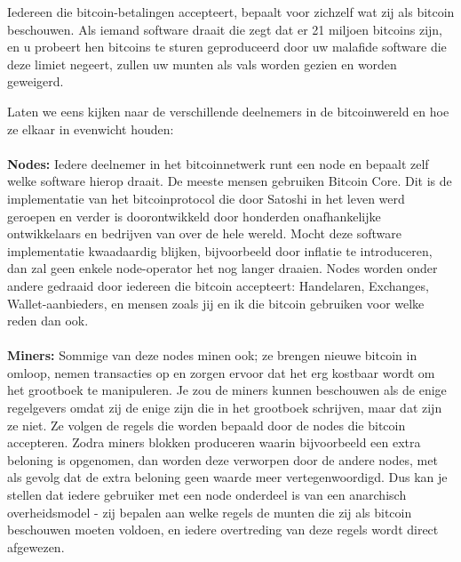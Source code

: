 Iedereen die bitcoin-betalingen accepteert, bepaalt voor zichzelf wat zij als bitcoin beschouwen. Als iemand software draait die zegt dat er 21 miljoen bitcoins zijn, en u probeert hen bitcoins te sturen geproduceerd door uw malafide software die deze limiet negeert, zullen uw munten als vals worden gezien en worden geweigerd.

Laten we eens kijken naar de verschillende deelnemers in de bitcoinwereld en hoe ze elkaar in evenwicht houden:

\paragraph{}
\noindent\textbf{Nodes:} 
Iedere deelnemer in het bitcoinnetwerk runt een node en bepaalt zelf welke software hierop draait. De meeste mensen gebruiken Bitcoin Core. Dit is de implementatie van het bitcoinprotocol die door Satoshi in het leven werd geroepen en verder is doorontwikkeld door honderden onafhankelijke ontwikkelaars en bedrijven van over de hele wereld. Mocht deze software implementatie kwaadaardig blijken, bijvoorbeeld door inflatie te introduceren, dan zal geen enkele node-operator het nog langer draaien. Nodes worden onder andere gedraaid door iedereen die bitcoin accepteert: Handelaren, Exchanges, Wallet-aanbieders, en mensen zoals jij en ik die bitcoin gebruiken voor welke reden dan ook. 

\paragraph{}
\noindent\textbf{Miners:} 
Sommige van deze nodes minen ook; ze brengen nieuwe bitcoin in omloop, nemen transacties op en zorgen ervoor dat het erg kostbaar wordt om het grootboek te manipuleren. Je zou de miners kunnen beschouwen als de enige regelgevers omdat zij de enige zijn die in het grootboek schrijven, maar dat zijn ze niet. Ze volgen de regels die worden bepaald door de nodes die bitcoin accepteren. Zodra miners blokken produceren waarin bijvoorbeeld een extra beloning is opgenomen, dan worden deze verworpen door de andere nodes, met als gevolg dat de extra beloning geen waarde meer vertegenwoordigd. Dus kan je stellen dat iedere gebruiker met een node onderdeel is van een anarchisch overheidsmodel - zij bepalen aan welke regels de munten die zij als bitcoin beschouwen moeten voldoen, en iedere overtreding van deze regels wordt direct afgewezen.

